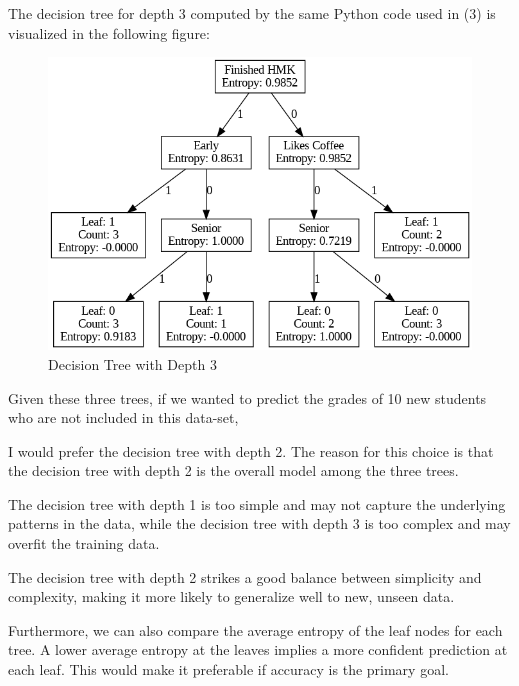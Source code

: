 \documentclass[12pt,letterpaper, onecolumn]{exam}
\begin{document}
\begin{questions}
\begin{parts}
      \begin{solution}

        The decision tree for depth 3 computed by the same Python code used in (3)
        is visualized in the following figure:

        \begin{figure}[H]
            \begin{minipage}{\textwidth} 
                \centering
                \includegraphics[width=\textwidth]{depth_3_tree.png}
                \caption{Decision Tree with Depth 3}
            \end{minipage}
        \end{figure}

        Given these three trees, if we wanted to predict the grades of 10 new students who are not included in this data-set,

        I would prefer the decision tree with depth 2. The reason for this choice is that the decision tree with depth 2 is the overall model among the three trees.

        The decision tree with depth 1 is too simple and may not capture the underlying patterns in the data,
        while the decision tree with depth 3 is too complex and may overfit the training data.

        The decision tree with depth 2 strikes a good balance between simplicity and complexity,
        making it more likely to generalize well to new, unseen data.

        Furthermore, we can also compare the average entropy of the leaf nodes for each tree.
        A lower average entropy at the leaves implies a more confident prediction at each leaf.
        This would make it preferable if accuracy is the primary goal.


\end{solution}
\end{parts}
\end{questions}
\end{document}
